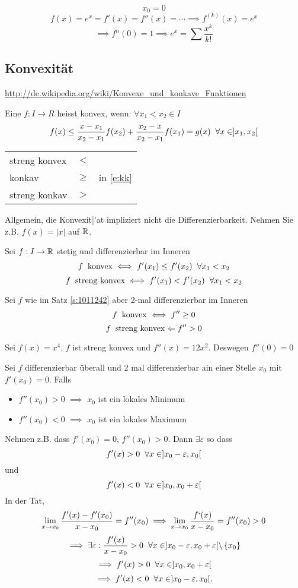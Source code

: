 \begin{Bsp}
  \[x_0=0\]
  \[f(x)=e^x=f'(x)=f''(x)=\cdots\implies f^{(k)}(x)=e^x\]
  \[\implies f^n(0)=1\implies e^x=\sum\frac{x^k}{k!}\]
\end{Bsp}
\subsection{Konvexität}
\url{http://de.wikipedia.org/wiki/Konvexe_und_konkave_Funktionen}
\begin{Def}
  Eine $f:I\to R$ heisst konvex, wenn:
  $\forall x_1 < x_2\in I$
  \begin{equation}\label{e:kk}
    f(x)\leq\frac{x-x_1}{x_2-x_1}f(x_2)+\frac{x_2-x}{x_2-x_1}f(x_1)=g(x)\hspace{2mm}\forall x\in ]x_1,x_2[
  \end{equation}
  \begin{tabular}{l|c|l}
    streng konvex & $<$\\
    konkav & $\geq$& in \eqref{e:kk}\\
    streng konkav & $>$\\
  \end{tabular}
\end{Def}
\begin{Bem}
Allgemein, die Konvexit|'at impliziert nicht die Differenzierbarkeit.
Nehmen Sie z.B. $f(x)= |x|$ auf $\mathbb{R}$. 
\end{Bem}
\begin{Sat}\label{s:1011242}
  Sei $f:I\to\mathbb{R}$ stetig und differenzierbar im Inneren
  \[f\hspace{2mm}\text{konvex} \iff f'(x_1)\leq f'(x_2)\hspace{2mm}\forall x_1<x_2\]
  \[f\hspace{2mm}\text{streng konvex} \iff f'(x_1) < f'(x_2)\hspace{2mm}\forall x_1<x_2\]
\end{Sat}
\begin{Kor}
  Sei $f$ wie im Satz \ref{s:1011242} aber 2-mal differenzierbar im Inneren
  \[f\hspace{2mm}\text{konvex}\iff f''\geq 0\]
  \[f\hspace{2mm}\text{streng konvex}\Leftarrow f''> 0\]
\end{Kor}
\begin{Bsp}
Sei  $f(x)=x^4$. $f$ ist streng konvex und $f''(x)=12x^2$. Deswegen $f''(0)=0$
\end{Bsp}
\begin{Bem}
  Sei $f$ differenzierbar überall und 2 mal differenzierbar ain einer Stelle $x_0$ mit $f'(x_0)=0$. 
Falls 
  \begin{itemize}
    \item $f''(x_0)>0$ $\implies$ $x_0$ ist ein lokales Minimum
    \item $f''(x_0)<0$ $\implies$ $x_0$ ist ein lokales Maximum
  \end{itemize}
Nehmen z.B. dass $f'(x_0)=0$, $f''(x_0)>0$. Dann $\exists \varepsilon$ so dass
  \[f'(x)>0\hspace{2mm}\forall x\in ]x_0-\varepsilon,x_0[\]
und
  \[f'(x)<0\hspace{2mm}\forall x\in ]x_0,x_0+\varepsilon[\]
In der Tat,
  \[\lim_{x\to x_0}\frac{f'(x)-f'(x_0)}{x-x_0}=f''(x_0)\implies\lim_{x\to x_0}
\frac{f`(x)}{x-x_0} =f''(x_0)>0\]
  \[\implies\exists\varepsilon:\frac{f'(x)}{x-x_0}>0\hspace{2mm}\forall x
\in]x_0-\varepsilon,x_0+\varepsilon[\setminus\left\{ x_0 \right\}\]
  \[\implies f'(x)>0\hspace{2mm}\forall x\in ]x_0,x_0+\varepsilon[\]
  \[\implies f'(x)<0\hspace{2mm}\forall x\in ]x_0-\varepsilon,x_0[ .\]
\end{Bem}
